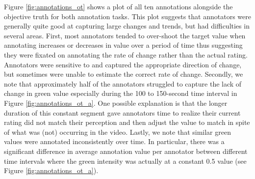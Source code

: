 \documentclass[times,twocolumn,final,authoryear]{elsarticle}
\begin{document}
Figure \ref{fig:annotations_ot} shows a plot of all ten annotations alongside the objective truth for both annotation tasks.  This plot suggests that annotators were generally quite good at capturing large changes and trends, but had difficulties in several areas.  First, most annotators tended to over-shoot the target value when annotating increases or decreases in value over a period of time thus suggesting they were fixated on annotating the rate of change rather than the actual rating.  Annotators were sensitive to and captured the appropriate direction of change, but sometimes were unable to estimate the correct rate of change.  Secondly, we note that approximately half of the annotators struggled to capture the lack of change in green value especially during the 100 to 150-second time interval in Figure \ref{fig:annotations_ot_a}.  One possible explanation is that the longer duration of this constant segment gave annotators time to realize their current rating did not match their perception and then adjust the value to match in spite of what was (not) occurring in the video.  Lastly, we note that similar green values were annotated inconsistently over time.  In particular, there was a significant difference in average annotation value per annotator between different time intervals where the green intensity was actually at a constant 0.5 value (see Figure \ref{fig:annotations_ot_a}).
\end{document}
